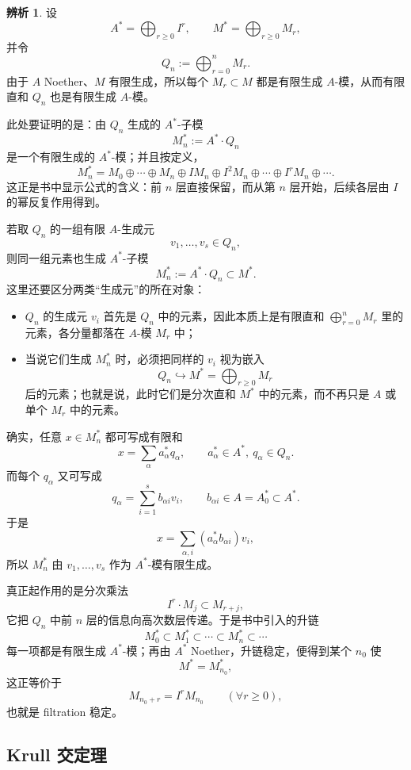 \documentclass[a4paper]{ctexart}
\theoremstyle{definition}
\theoremstyle{analysis}
\newtheorem{remark}{辨析}[section]
\theoremstyle{plain}
\begin{document}
\begin{remark}
设
\[
  A^*=\bigoplus_{r\ge 0}I^r,\qquad
  M^*=\bigoplus_{r\ge 0}M_r,
\]
并令
\[
  Q_n:=\bigoplus_{r=0}^n M_r.
\]
由于 \(A\) Noether、\(M\) 有限生成，所以每个 \(M_r\subset M\) 都是有限生成 \(A\)-模，从而有限直和 \(Q_n\) 也是有限生成 \(A\)-模。

此处要证明的是：由 \(Q_n\) 生成的 \(A^*\)-子模
\[
  M_n^*:=A^*\cdot Q_n
\]
是一个有限生成的 \(A^*\)-模；并且按定义，
\[
  M_n^*
  =
  M_0\oplus\cdots\oplus M_n\oplus IM_n\oplus I^2M_n\oplus\cdots\oplus I^rM_n\oplus\cdots .
\]
这正是书中显示公式的含义：前 \(n\) 层直接保留，而从第 \(n\) 层开始，后续各层由 \(I\) 的幂反复作用得到。

若取 \(Q_n\) 的一组有限 \(A\)-生成元
\[
  v_1,\dots,v_s\in Q_n,
\]
则同一组元素也生成 \(A^*\)-子模
\[
  M_n^*:=A^*\cdot Q_n\subset M^*.
\]
这里还要区分两类“生成元”的所在对象：
\begin{itemize}
  \item \(Q_n\) 的生成元 \(v_i\) 首先是 \(Q_n\) 中的元素，因此本质上是有限直和 \(\bigoplus_{r=0}^n M_r\) 里的元素，各分量都落在 \(A\)-模 \(M_r\) 中；
  \item 当说它们生成 \(M_n^*\) 时，必须把同样的 \(v_i\) 视为嵌入
  \[
    Q_n\hookrightarrow M^*=\bigoplus_{r\ge 0}M_r
  \]
  后的元素；也就是说，此时它们是分次直和 \(M^*\) 中的元素，而不再只是 \(A\) 或单个 \(M_r\) 中的元素。
\end{itemize}

确实，任意 \(x\in M_n^*\) 都可写成有限和
\[
  x=\sum_\alpha a_\alpha^* q_\alpha,
  \qquad
  a_\alpha^*\in A^*,\ q_\alpha\in Q_n.
\]
而每个 \(q_\alpha\) 又可写成
\[
  q_\alpha=\sum_{i=1}^s b_{\alpha i}v_i,
  \qquad
  b_{\alpha i}\in A=A_0^*\subset A^*.
\]
于是
\[
  x=\sum_{\alpha,i}(a_\alpha^*b_{\alpha i})v_i,
\]
所以 \(M_n^*\) 由 \(v_1,\dots,v_s\) 作为 \(A^*\)-模有限生成。

真正起作用的是分次乘法
\[
  I^r\cdot M_j\subset M_{r+j},
\]
它把 \(Q_n\) 中前 \(n\) 层的信息向高次数层传递。于是书中引入的升链
\[
  M_0^*\subset M_1^*\subset \cdots \subset M_n^*\subset \cdots
\]
每一项都是有限生成 \(A^*\)-模；再由 \(A^*\) Noether，升链稳定，便得到某个 \(n_0\) 使
\[
  M^*=M_{n_0}^*,
\]
这正等价于
\[
  M_{n_0+r}=I^rM_{n_0}\qquad (\forall r\ge 0),
\]
也就是 filtration 稳定。
\end{remark}

\subsection{Krull 交定理}\label{subsec:krull-intersection}
\end{document}
